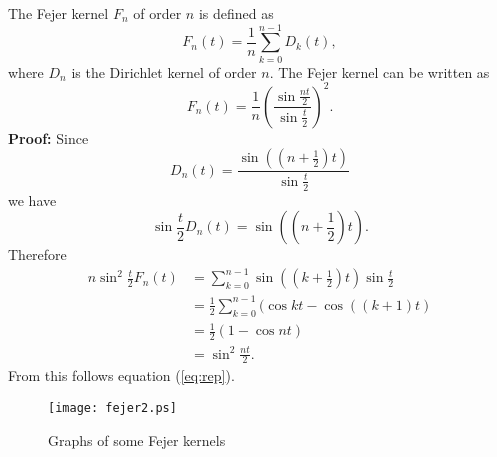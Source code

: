 \documentclass[12pt]{article}
\begin{document}
The Fejer kernel $F_n$ of order $n$ is defined as
$$F_n(t)=\frac{1}{n}\sum_{k=0}^{n-1}D_k(t),$$
where $D_n$ is the Dirichlet kernel of order $n$. The Fejer kernel can be written as
\begin{equation}\label{eq:rep}
F_n(t)=\frac{1}{n}\left(\frac{\sin\frac{nt}{2}}{\sin\frac{t}{2}}\right)^2.
\end{equation}
\textbf{Proof:} Since
$$D_n(t)=\frac{\sin\left(\left(n+\frac{1}{2}\right)t\right)}{\sin\frac{t}{2}}$$
we have
$$\sin\frac{t}{2}D_n(t)=\sin\left(\left(n+\frac{1}{2}\right)t\right).$$
Therefore
\begin{align*}
n\sin^2\frac{t}{2}F_n(t)& =\sum_{k=0}^{n-1}\sin\left(\left(k+\frac{1}{2}\right)t\right)\sin\frac{t}{2}\\
&=\frac{1}{2}\sum_{k=0}^{n-1}(\cos kt-\cos((k+1)t)\\
&=\frac{1}{2}(1-\cos nt)\\
&=\sin^2\frac{nt}{2}.
\end{align*}
From this follows equation (\ref{eq:rep}).
\begin{figure}[h]
\begin{centering}
\texttt{[image: fejer2.ps]}
\caption{Graphs of some Fejer kernels}\label{fig:fejer}
\end{centering}
\end{figure}
\end{document}
